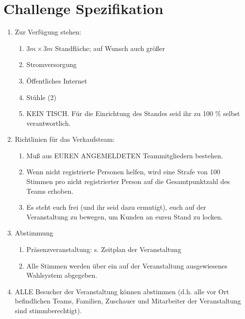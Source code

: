 \documentclass[a4paper,12pt]{article}
\begin{document}
\section{Challenge Spezifikation}
\begin{enumerate}
\item Zur Verfügung stehen:
	\begin{enumerate}
		\item $3 m \times 3 m$ Standfläche; auf Wunsch auch größer
		\item Stromversorgung
		\item Öffentliches Internet
		\item Stühle (2)
		\item KEIN TISCH. Für die Einrichtung des Standes seid ihr zu
			100 \% selbst verantwortlich.
	\end{enumerate}
	\item Richtlinien für das Verkaufsteam:
	\begin{enumerate}
		\item Muß aus EUREN ANGEMELDETEN Teammitgliedern bestehen.
		\item Wenn nicht registrierte Personen helfen, wird eine Strafe
			von 100 Stimmen pro nicht registrierter Person auf die
			Gesamtpunktzahl des Teams erhoben.
		\item Es steht euch frei (und ihr seid dazu ermutigt), euch
			auf der Veranstaltung zu bewegen, um Kunden an euren
			Stand zu locken.
	\end{enumerate}
	\item Abstimmung
        \begin{enumerate}
		\item Präsenzveranstaltung: s. Zeitplan der Veranstaltung
		\item Alle Stimmen werden über ein auf der Veranstaltung
			ausgewiesenes Wahlsystem abgegeben.
        \end{enumerate}
	\item ALLE Besucher der Veranstaltung können abstimmen (d.h. alle
		vor Ort befindlichen Teams, Familien, Zuschauer und Mitarbeiter
		der Veranstaltung sind stimmberechtigt).
\end{enumerate}
\end{document}
